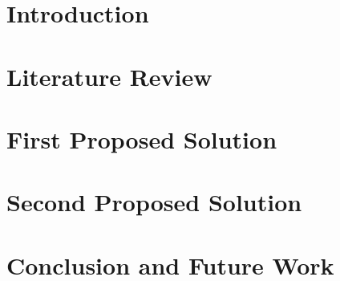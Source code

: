 \documentclass[11pt,oneside,final]{ntu_qe}
\newcommand{\setdoublespace}{\dsp}
\newcommand*\NewPage{\newpage\null\thispagestyle{empty}\newpage}
\begin{document}
\setdoublespace


\hsp
\NewPage

\hsp
\chapter{Introduction}\label{CH1} %

\chapter{Literature Review}\label{CH2}

\chapter{First Proposed Solution}\label{CH3}

\chapter{Second Proposed Solution}\label{CH4}

\chapter{Conclusion and Future Work}\label{CH5}

\renewcommand{\bibname}{List of Publications}

\ssp
\renewcommand{\bibname}{References}

%
%
\end{document}
